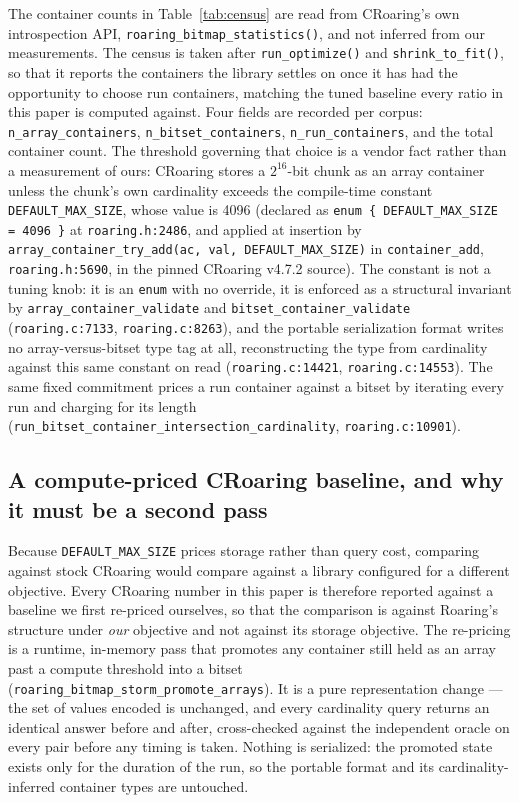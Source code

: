 \begin{sloppypar}
The container counts in Table~\ref{tab:census} are read from CRoaring's own introspection API,
\texttt{roaring\_bitmap\_statistics()}, and not inferred from our measurements. The census is taken
after \texttt{run\_optimize()} and \texttt{shrink\_to\_fit()}, so that it reports the containers the
library settles on once it has had the opportunity to choose run containers, matching the tuned
baseline every ratio in this paper is computed against. Four fields are recorded per corpus:
\texttt{n\_array\_containers}, \texttt{n\_bitset\_containers}, \texttt{n\_run\_containers}, and the
total container count. The threshold governing that choice is a vendor fact rather than a measurement
of ours: CRoaring stores a $2^{16}$-bit chunk as an array container unless the chunk's own cardinality
exceeds the compile-time constant \texttt{DEFAULT\_MAX\_SIZE}, whose value is
4096 (declared as
\texttt{enum \{ DEFAULT\_MAX\_SIZE = 4096 \}} at \texttt{roaring.h:2486}, and applied at insertion by
\texttt{array\_container\_try\_add(ac, val, DEFAULT\_MAX\_SIZE)} in \texttt{container\_add},
\texttt{roaring.h:5690}, in the pinned CRoaring v4.7.2 source). The constant is not a tuning knob: it is an
\texttt{enum} with no override, it is enforced as a structural invariant by
\texttt{array\_container\_validate} and \texttt{bitset\_container\_validate}
(\texttt{roaring.c:7133}, \texttt{roaring.c:8263}), and the portable serialization format writes no
array-versus-bitset type tag at all, reconstructing the type from cardinality against this same
constant on read (\texttt{roaring.c:14421}, \texttt{roaring.c:14553}). The same fixed commitment prices a run container against a bitset by iterating every run and
charging for its length (\texttt{run\_bitset\_container\_intersection\_cardinality},
\texttt{roaring.c:10901}).
\end{sloppypar}

\subsection*{A compute-priced CRoaring baseline, and why it must be a second pass}

Because \texttt{DEFAULT\_MAX\_SIZE} prices storage rather than query cost, comparing against stock
CRoaring would compare against a library configured for a different objective. Every CRoaring number
in this paper is therefore reported against a baseline we first re-priced ourselves, so that the
comparison is against Roaring's structure under \emph{our} objective and not against its storage
objective. The re-pricing is a runtime, in-memory pass that promotes any container still held as an
array past a compute threshold into a bitset
(\texttt{roaring\_bitmap\_storm\_promote\_arrays}). It is a pure representation change --- the set of
values encoded is unchanged, and every cardinality query returns an identical answer before and
after, cross-checked against the independent oracle on every pair before any timing is taken. Nothing
is serialized: the promoted state exists only for the duration of the run, so the portable format and
its cardinality-inferred container types are untouched.

